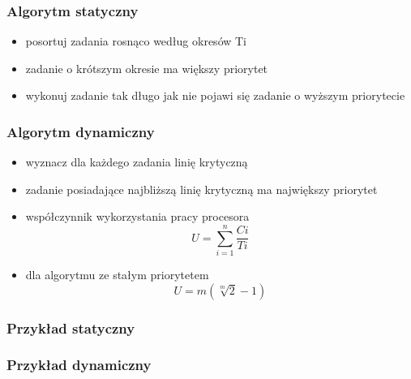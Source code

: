 \documentclass[12pt,a4paper]{article}
\begin{document}
\subsubsection{Algorytm statyczny}
\begin{itemize}
\item posortuj zadania rosnąco według okresów Ti
\item zadanie o krótszym okresie ma większy priorytet
\item wykonuj zadanie tak długo jak nie pojawi się zadanie o wyższym priorytecie
\end{itemize}
\subsubsection{Algorytm dynamiczny}
\begin{itemize}
\item wyznacz dla każdego zadania linię krytyczną
\item zadanie posiadające najbliższą linię krytyczną ma największy priorytet
\item współczynnik wykorzystania pracy procesora
\begin{equation}
U=\sum\limits_{i=1}^{n}\frac{Ci}{Ti}
\end{equation}
\item dla algorytmu ze stałym priorytetem
\begin{equation}
U=m(\sqrt[m]{2}-1)
\end{equation}
\end{itemize}
\subsubsection{Przykład statyczny}
\subsubsection{Przykład dynamiczny}
\end{document}
